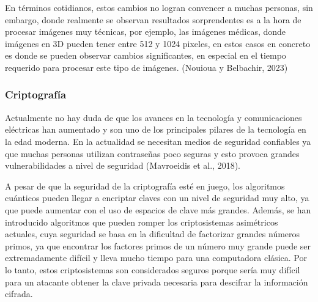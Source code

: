 \documentclass[twoside]{article}
\begin{document}
En términos cotidianos, estos cambios no logran convencer a muchas personas, sin embargo, donde realmente se observan resultados sorprendentes es a la hora de procesar imágenes muy técnicas, por ejemplo, las imágenes médicas, donde imágenes en 3D pueden tener entre 512 y 1024 pixeles, en estos casos en concreto es donde se pueden observar cambios significantes, en especial en el tiempo requerido para procesar este tipo de imágenes. (Nouioua y Belbachir, 2023)

\subsubsection{Criptografía}
Actualmente no hay duda de que los avances en la tecnología y comunicaciones eléctricas han aumentado y son uno de los principales pilares de la tecnología en la edad moderna. En la actualidad se necesitan medios de seguridad confiables ya que muchas personas utilizan contraseñas poco seguras y esto provoca grandes vulnerabilidades a nivel de seguridad (Mavroeidis et al., 2018). 

A pesar de que la seguridad de la criptografía esté en juego, los algoritmos cuánticos pueden llegar a encriptar claves con un nivel de seguridad muy alto, ya que puede aumentar con el uso de espacios de clave más grandes. Además, se han introducido algoritmos que pueden romper los criptosistemas asimétricos actuales, cuya seguridad se basa en la dificultad de factorizar grandes números primos, ya que encontrar los factores primos de un número muy grande puede ser extremadamente difícil y lleva mucho tiempo para una computadora clásica. Por lo tanto, estos criptosistemas son considerados seguros porque sería muy difícil para un atacante obtener la clave privada necesaria para descifrar la información cifrada. 
\end{document}
